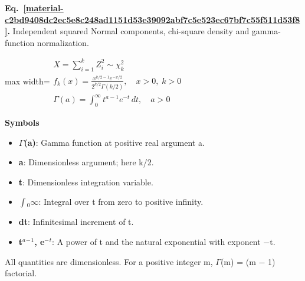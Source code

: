 \documentclass[11pt,a4paper]{article}
\begin{document}
\par\medskip
\noindent\begin{minipage}{\linewidth}
\label{material-c2bd9408dc2ec5e8c248ad1151d53e39092abf7c5e523ec67bf7c55f511d53f8}
\noindent\textbf{Eq.~\ref*{material-c2bd9408dc2ec5e8c248ad1151d53e39092abf7c5e523ec67bf7c55f511d53f8}.} Independent squared Normal components, chi-square density and gamma-function normalization.\par\nopagebreak
\begin{center}\begin{adjustbox}{max width=\linewidth}$\displaystyle \begin{gathered}X=\sum_{i=1}^{k}Z_i^2\sim\chi^2_k\\f_k(x)=\frac{x^{k/2-1}e^{-x/2}}{2^{k/2}\Gamma(k/2)},\quad x>0,\;k>0\\\Gamma(a)=\int_0^\infty t^{a-1}e^{-t}\,dt,\quad a>0\end{gathered}$\end{adjustbox}\end{center}

\par\noindent\textbf{Symbols}

\begin{itemize}\setlength{\itemsep}{1pt}\setlength{\parsep}{0pt}
\item \textbf{\ensuremath{\Gamma}(a)}: Gamma function at positive real argument a.
\item \textbf{a}: Dimensionless argument; here k/2.
\item \textbf{t}: Dimensionless integration variable.
\item \textbf{\ensuremath{\int}\ensuremath{{}_0}\ensuremath{\infty}}: Integral over t from zero to positive infinity.
\item \textbf{dt}: Infinitesimal increment of t.
\item \textbf{t\ensuremath{{}^a}\ensuremath{{}^-}\ensuremath{{}^1}, e\ensuremath{{}^-}\ensuremath{{}^t}}: A power of t and the natural exponential with exponent \ensuremath{-}t.
\end{itemize}

All quantities are dimensionless. For a positive integer m, \ensuremath{\Gamma}(m) = (m \ensuremath{-} 1) factorial.


\end{minipage}
\end{document}
